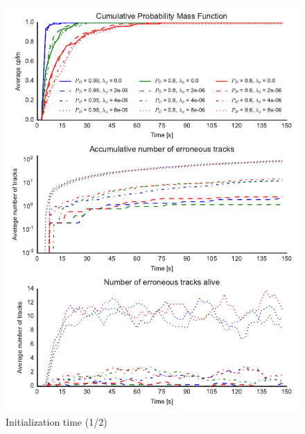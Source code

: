 \begin{figure}
\centering
\includegraphics{Figures/plots/Scenario0_Init-Time(1-2).pdf}
\caption{Initialization time (1/2)}\label{fig:init_time_1-2}
\end{figure}

